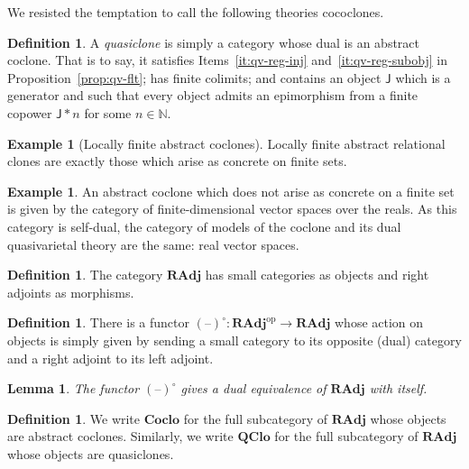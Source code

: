 \documentclass[11pt, a4paper, twoside,leqno]{amsart}
\newcommand{\cat}[1]{\mathbf{#1}}
\newcommand{\thg}{{\mathord{\text{--}}}}
\numberwithin{equation}{section}
\theoremstyle{plain}
\newtheorem{Lemma}[Thm]{Lemma}
\theoremstyle{definition}
\newtheorem{Defn}[Thm]{Definition}
\newtheorem{Ex}[Thm]{Example}
\begin{document}
We resisted the temptation to call the following theories cococlones.
\begin{Defn}
  \label{def:5}
  A \emph{quasiclone} is simply a category whose dual is an abstract
  coclone. That is to say, it 
  satisfies Items~\ref{it:qv-reg-inj}
  and~\ref{it:qv-reg-subobj} in Proposition~\ref{prop:qv-flt}; has
  finite colimits; and contains an object \(\mathsf{J}\) which is a
  generator and such that
  every object admits an epimorphism from a finite copower
  \(\mathsf{J}\ast n\) for some \(n\in \mathbb{N}
  \).
\end{Defn}



\begin{Ex}[Locally finite abstract coclones]
  \label{ex:loc-fin-arc}
  Locally finite abstract relational clones are exactly those which
  arise as concrete on finite sets. 
\end{Ex}

\begin{Ex}%
  \label{ex:vector-space}
  An abstract coclone which does not arise as 
  concrete on a finite set is given by the category
  of finite-dimensional vector spaces over the reals. As this category
  is self-dual, the category of models of the coclone and its
  dual quasivarietal theory are the same: real vector spaces. 
\end{Ex}


\begin{Defn}
  \label{def:rad-cat}
  The category \(\cat{RAdj}\) has small categories as objects and right
  adjoints as morphisms.
\end{Defn}

\begin{Defn}
  \label{def:func-o}
  There is a functor \((\thg)^{\circ} \colon \cat{RAdj} ^{\mathrm{op}} \rightarrow \cat{RAdj}\) whose
  action on objects is simply given by sending a small category to its
  opposite (dual) category and a right adjoint to its left adjoint.
\end{Defn}

\begin{Lemma}
  \label{lem:12}
  The functor \((\thg)^{\circ}\) gives a dual equivalence of \(\cat{RAdj}\) with itself.
\end{Lemma}

\begin{Defn}
  \label{def:subcats-radj}
  We write \(\cat{Coclo}\) for the full subcategory of \(\cat{RAdj}\)
  whose objects are abstract coclones. Similarly, we write
  \(\cat{QClo}\) for the full subcategory of \(\cat{RAdj}\)
  whose objects are quasiclones.
\end{Defn}
\end{document}
